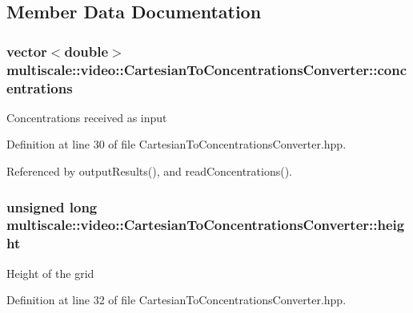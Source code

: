 \subsection{Member Data Documentation}
\hypertarget{classmultiscale_1_1video_1_1CartesianToConcentrationsConverter_a335f54163cbabeaa80c1da811b9f9c0c}{
\subsubsection[{concentrations}]{\setlength{\rightskip}{0pt plus 5cm}vector$<$double$>$ multiscale\-::video\-::\-Cartesian\-To\-Concentrations\-Converter\-::concentrations\hspace{0.3cm}{\ttfamily [private]}}}\label{classmultiscale_1_1video_1_1CartesianToConcentrationsConverter_a335f54163cbabeaa80c1da811b9f9c0c}
Concentrations received as input 

Definition at line 30 of file Cartesian\-To\-Concentrations\-Converter.\-hpp.



Referenced by output\-Results(), and read\-Concentrations().

\hypertarget{classmultiscale_1_1video_1_1CartesianToConcentrationsConverter_a94e58072f2e143bd6476133370ffb37f}{
\subsubsection[{height}]{\setlength{\rightskip}{0pt plus 5cm}unsigned long multiscale\-::video\-::\-Cartesian\-To\-Concentrations\-Converter\-::height\hspace{0.3cm}{\ttfamily [private]}}}\label{classmultiscale_1_1video_1_1CartesianToConcentrationsConverter_a94e58072f2e143bd6476133370ffb37f}
Height of the grid 

Definition at line 32 of file Cartesian\-To\-Concentrations\-Converter.\-hpp.



